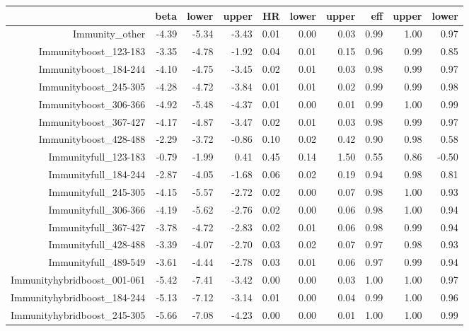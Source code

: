 \begin{table}[ht]
\centering
\begin{tabular}{rrrrrrrrrr}
  \hline
 & beta & lower & upper & HR & lower & upper & eff & upper & lower \\ 
  \hline
Immunity\_other & -4.39 & -5.34 & -3.43 & 0.01 & 0.00 & 0.03 & 0.99 & 1.00 & 0.97 \\ 
  Immunityboost\_123-183 & -3.35 & -4.78 & -1.92 & 0.04 & 0.01 & 0.15 & 0.96 & 0.99 & 0.85 \\ 
  Immunityboost\_184-244 & -4.10 & -4.75 & -3.45 & 0.02 & 0.01 & 0.03 & 0.98 & 0.99 & 0.97 \\ 
  Immunityboost\_245-305 & -4.28 & -4.72 & -3.84 & 0.01 & 0.01 & 0.02 & 0.99 & 0.99 & 0.98 \\ 
  Immunityboost\_306-366 & -4.92 & -5.48 & -4.37 & 0.01 & 0.00 & 0.01 & 0.99 & 1.00 & 0.99 \\ 
  Immunityboost\_367-427 & -4.17 & -4.87 & -3.47 & 0.02 & 0.01 & 0.03 & 0.98 & 0.99 & 0.97 \\ 
  Immunityboost\_428-488 & -2.29 & -3.72 & -0.86 & 0.10 & 0.02 & 0.42 & 0.90 & 0.98 & 0.58 \\ 
  Immunityfull\_123-183 & -0.79 & -1.99 & 0.41 & 0.45 & 0.14 & 1.50 & 0.55 & 0.86 & -0.50 \\ 
  Immunityfull\_184-244 & -2.87 & -4.05 & -1.68 & 0.06 & 0.02 & 0.19 & 0.94 & 0.98 & 0.81 \\ 
  Immunityfull\_245-305 & -4.15 & -5.57 & -2.72 & 0.02 & 0.00 & 0.07 & 0.98 & 1.00 & 0.93 \\ 
  Immunityfull\_306-366 & -4.19 & -5.62 & -2.76 & 0.02 & 0.00 & 0.06 & 0.98 & 1.00 & 0.94 \\ 
  Immunityfull\_367-427 & -3.78 & -4.72 & -2.83 & 0.02 & 0.01 & 0.06 & 0.98 & 0.99 & 0.94 \\ 
  Immunityfull\_428-488 & -3.39 & -4.07 & -2.70 & 0.03 & 0.02 & 0.07 & 0.97 & 0.98 & 0.93 \\ 
  Immunityfull\_489-549 & -3.61 & -4.44 & -2.78 & 0.03 & 0.01 & 0.06 & 0.97 & 0.99 & 0.94 \\ 
  Immunityhybridboost\_001-061 & -5.42 & -7.41 & -3.42 & 0.00 & 0.00 & 0.03 & 1.00 & 1.00 & 0.97 \\ 
  Immunityhybridboost\_184-244 & -5.13 & -7.12 & -3.14 & 0.01 & 0.00 & 0.04 & 0.99 & 1.00 & 0.96 \\ 
  Immunityhybridboost\_245-305 & -5.66 & -7.08 & -4.23 & 0.00 & 0.00 & 0.01 & 1.00 & 1.00 & 0.99 \\ 

\end{tabular}
\end{table}
